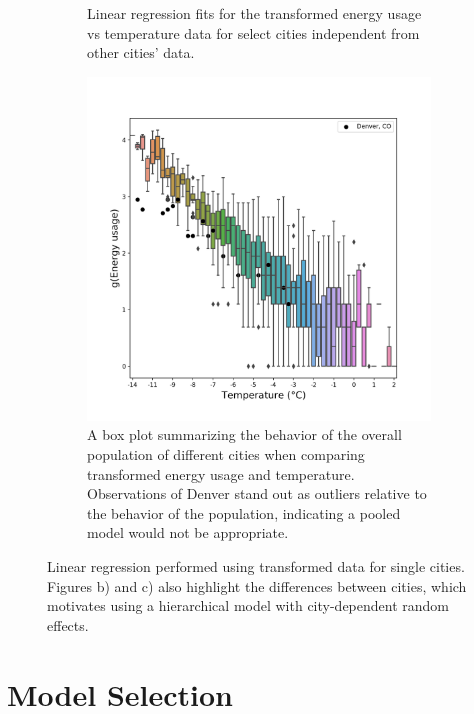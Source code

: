 \documentclass[11pt]{article}
\begin{document}
\begin{figure}[ht]
\begin{subfigure}{0.32\textwidth}
    \caption{Linear regression fits for the transformed energy usage vs temperature data for select cities independent from other cities' data.}
    \label{fig:select_cities}
  \end{subfigure}
  \begin{subfigure}{0.32\textwidth}
    \includegraphics[width=\textwidth]{denver_relative_pooled.png}
    \caption{A box plot summarizing the behavior of the overall population of different cities when comparing transformed energy usage and temperature. Observations of Denver stand out as outliers relative to the behavior of the population, indicating a pooled model would not be appropriate.}
    \label{fig:relative_pooled}
  \end{subfigure}%
  \caption{Linear regression performed using transformed data for single cities. Figures b) and c) also highlight the differences between cities, which motivates using a hierarchical model with city-dependent random effects.}
\end{figure}

\section{\label{sec:model}Model Selection}
 
\end{document}
